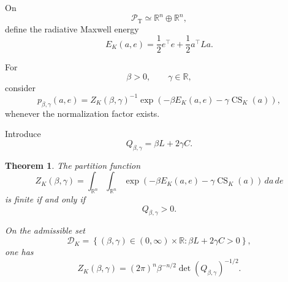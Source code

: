 \documentclass[11pt]{article}
\newtheorem{theorem}{Theorem}
\theoremstyle{definition}
\theoremstyle{remark}
\newcommand{\R}{\mathbb{R}}
\newcommand{\CS}{\operatorname{CS}}
\begin{document}
On
\begin{equation}
\mathcal P_{\mathrm T}
\simeq
\R^n\oplus\R^n,
\end{equation}
define the radiative Maxwell energy
\begin{equation}
E_K(a,e)
=
\frac12e^\top e
+
\frac12a^\top La.
\label{eq:total-energy}
\end{equation}

For
\begin{equation}
\beta>0,
\qquad
\gamma\in\R,
\end{equation}
consider
\begin{equation}
p_{\beta,\gamma}(a,e)
=
Z_K(\beta,\gamma)^{-1}
\exp\left(
-\beta E_K(a,e)
-
\gamma\CS_K(a)
\right),
\label{eq:density}
\end{equation}
whenever the normalization factor exists.

Introduce
\begin{equation}
Q_{\beta,\gamma}
=
\beta L+2\gamma C.
\label{eq:Q}
\end{equation}

\begin{theorem}
\label{thm:partition}
The partition function
\begin{equation}
Z_K(\beta,\gamma)
=
\int_{\R^n}
\int_{\R^n}
\exp\left(
-\beta E_K(a,e)
-
\gamma\CS_K(a)
\right)
\,da\,de
\label{eq:Z-definition}
\end{equation}
is finite if and only if
\begin{equation}
Q_{\beta,\gamma}>0.
\label{eq:Q-positive}
\end{equation}

On the admissible set
\begin{equation}
\mathscr D_K
=
\left\{
(\beta,\gamma)\in(0,\infty)\times\R:
\beta L+2\gamma C>0
\right\},
\label{eq:admissible}
\end{equation}
one has
\begin{equation}
Z_K(\beta,\gamma)
=
(2\pi)^n
\beta^{-n/2}
\det(Q_{\beta,\gamma})^{-1/2}.
\label{eq:Z-explicit}
\end{equation}
\end{theorem}
\end{document}
